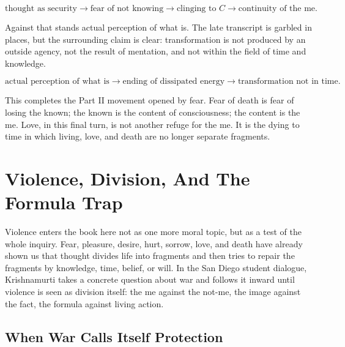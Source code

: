 \documentclass[11pt,oneside]{book}
\begin{document}
\begin{equation}
\text{thought as security}
\longrightarrow
\text{fear of not knowing}
\longrightarrow
\text{clinging to } C
\longrightarrow
\text{continuity of the me}.
\end{equation}

Against that stands actual perception of what is. The late transcript is garbled in places, but the surrounding claim is clear: transformation is not produced by an outside agency, not the result of mentation, and not within the field of time and knowledge.

\begin{equation}
\text{actual perception of what is}
\longrightarrow
\text{ending of dissipated energy}
\longrightarrow
\text{transformation not in time}.
\end{equation}

This completes the Part II movement opened by fear. Fear of death is fear of losing the known; the known is the content of consciousness; the content is the me. Love, in this final turn, is not another refuge for the me. It is the dying to time in which living, love, and death are no longer separate fragments.


\chapter{Violence, Division, And The Formula Trap}

Violence enters the book here not as one more moral topic, but as a test of the whole inquiry. Fear, pleasure, desire, hurt, sorrow, love, and death have already shown us that thought divides life into fragments and then tries to repair the fragments by knowledge, time, belief, or will. In the San Diego student dialogue, Krishnamurti takes a concrete question about war and follows it inward until violence is seen as division itself: the me against the not-me, the image against the fact, the formula against living action.

\section{When War Calls Itself Protection}
\end{document}

